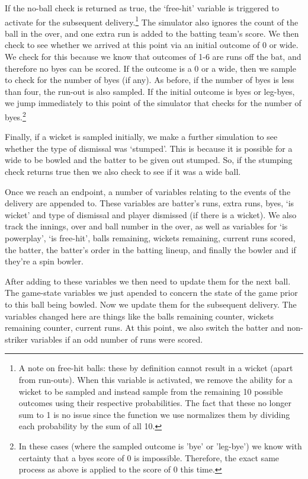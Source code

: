 If the no-ball check is returned as true, the ‘free-hit’ variable is triggered to activate for the subsequent delivery.\footnote{A note on free-hit balls: these by definition cannot result in a wicket (apart from run-outs). When this variable is activated, we remove the ability for a wicket to be sampled and instead sample from the remaining 10 possible outcomes using their respective probabilities. The fact that these no longer sum to 1 is no issue since the function we use normalizes them by dividing each probability by the sum of all 10.} The simulator also ignores the count of the ball in the over, and one extra run is added to the batting team’s score. We then check to see whether we arrived at this point via an initial outcome of 0 or wide. We check for this because we know that outcomes of 1-6 are runs off the bat, and therefore no byes can be scored. If the outcome is a 0 or a wide, then we sample to check for the number of byes (if any). As before, if the number of byes is less than four, the run-out is also sampled. If the initial outcome is byes or leg-byes, we jump immediately to this point of the simulator that checks for the number of byes.\footnote{In these cases (where the sampled outcome is 'bye' or 'leg-bye') we know with certainty that a byes score of 0 is impossible. Therefore, the exact same process as above is applied to the score of 0 this time.}

Finally, if a wicket is sampled initially, we make a further simulation to see whether the type of dismissal was ‘stumped’. This is because it is possible for a wide to be bowled and the batter to be given out stumped. So, if the stumping check returns true then we also check to see if it was a wide ball.

Once we reach an endpoint, a number of variables relating to the events of the delivery are appended to. These variables are batter's runs, extra runs, byes, `is wicket' and type of dismissal and player dismissed (if there is a wicket). We also track the innings, over and ball number in the over, as well as variables for `is powerplay', `is free-hit', balls remaining, wickets remaining, current runs scored, the batter, the batter's order in the batting lineup, and finally the bowler and if they're a spin bowler.

After adding to these variables we then need to update them for the next ball. The game-state variables we just apended to concern the state of the game prior to this ball being bowled. Now we update them for the subsequent delivery. The variables changed here are things like the balls remaining counter, wickets remaining counter, current runs. At this point, we also switch the batter and non-striker variables if an odd number of runs were scored.

